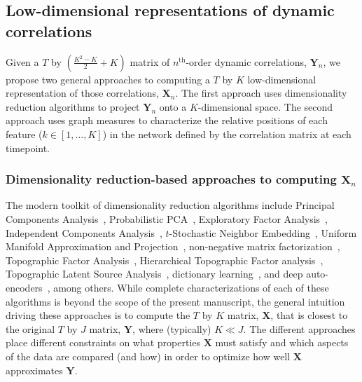 \documentclass[english]{article}
\begin{document}
\subsection*{Low-dimensional representations of dynamic
  correlations}

Given a $T$ by $\left( \frac{K^2 - K}{2} + K \right)$ matrix of
$n^\mathrm{th}$-order dynamic correlations, $\mathbf{Y}_n$, we propose
two general approaches to computing a $T$ by $K$ low-dimensional
representation of those correlations, $\mathbf{X}_n$.  The first
approach uses dimensionality reduction algorithms to project
$\mathbf{Y}_n$ onto a $K$-dimensional space.  The second approach uses
graph measures to characterize the relative positions of each feature
($k \in \left[1, ..., K \right]$) in the network defined by the
correlation matrix at each timepoint.

\subsubsection*{Dimensionality reduction-based approaches to computing
  $\mathbf{X}_n$}

The modern toolkit of dimensionality reduction algorithms include
Principal Components Analysis~\citep[PCA;][]{Pear01}, Probabilistic
PCA~\citep[PPCA;][]{TippBish99}, Exploratory Factor
Analysis~\citep[EFA;][]{Spea04}, Independent Components
Analysis~\citep[ICA;][]{JuttHera91, ComoEtal91}, $t$-Stochastic
Neighbor Embedding~\citep[$t$-SNE;][]{MaatHint08}, Uniform Manifold
Approximation and Projection~\citep[UMAP;][]{McInEtal18}, non-negative
matrix factorization~\citep[NMF;][]{LeeSeun99}, Topographic Factor
Analysis~\cite[TFA;][]{MannEtal14b}, Hierarchical Topographic Factor
analysis~\cite[HTFA;][]{MannEtal18}, Topographic Latent Source
Analysis~\cite[TLSA;][]{GersEtal11}, dictionary
learning~\citep{MairEtal09a, MairEtal09b}, and deep
auto-encoders~\citep{HintSala06}, among others.  While complete
characterizations of each of these algorithms is beyond the scope of
the present manuscript, the general intuition driving these approaches
is to compute the $T$ by $K$ matrix, $\mathbf{X}$, that is closest to
the original $T$ by $J$ matrix, $\mathbf{Y}$, where (typically)
$K \ll J$.  The different approaches place different constraints on
what properties $\mathbf{X}$ must satisfy and which aspects of the
data are compared (and how) in order to optimize how well
$\mathbf{X}$ approximates $\mathbf{Y}$.
\end{document}
